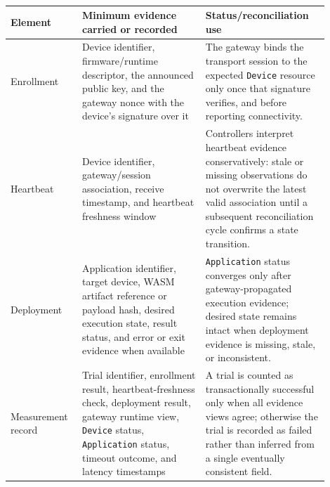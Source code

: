 \begingroup
\color{red}
\begin{table}[pos=t]
\centering
\caption{}
\footnotesize
\setlength{\tabcolsep}{3pt}
\begin{tabular}{p{0.18\linewidth} p{0.36\linewidth} p{0.36\linewidth}}
\toprule
\textbf{Element} & \textbf{Minimum evidence carried or recorded} & \textbf{Status/reconciliation use} \\
\midrule
Enrollment & Device identifier, firmware/runtime descriptor, the announced public key, and the gateway nonce with the device's signature over it & The gateway binds the transport session to the expected \texttt{Device} resource only once that signature verifies, and before reporting connectivity. \\
Heartbeat & Device identifier, gateway/session association, receive timestamp, and heartbeat freshness window & Controllers interpret heartbeat evidence conservatively: stale or missing observations do not overwrite the latest valid association until a subsequent reconciliation cycle confirms a state transition. \\
Deployment & Application identifier, target device, WASM artifact reference or payload hash, desired execution state, result status, and error or exit evidence when available & \texttt{Application} status converges only after gateway-propagated execution evidence; desired state remains intact when deployment evidence is missing, stale, or inconsistent. \\
Measurement record & Trial identifier, enrollment result, heartbeat-freshness check, deployment result, gateway runtime view, \texttt{Device} status, \texttt{Application} status, timeout outcome, and latency timestamps & A trial is counted as transactionally successful only when all evidence views agree; otherwise the trial is recorded as failed rather than inferred from a single eventually consistent field. \\
\bottomrule
\end{tabular}
\end{table}
\endgroup

